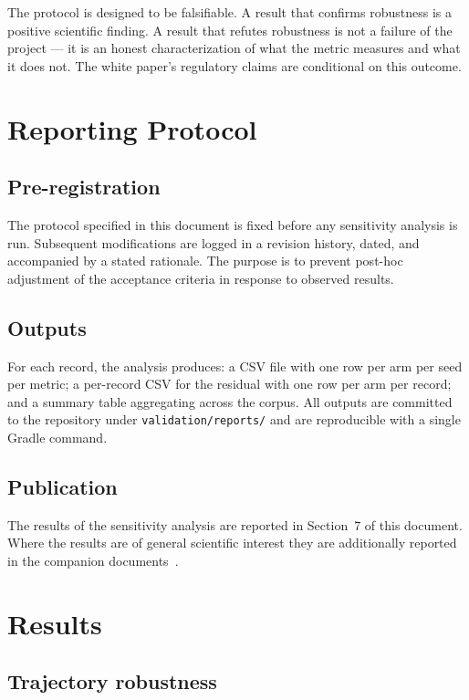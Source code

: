 \documentclass[11pt]{article}
\begin{document}
The protocol is designed to be falsifiable. A result that confirms
robustness is a positive scientific finding. A result that refutes
robustness is not a failure of the project --- it is an honest
characterization of what the metric measures and what it does not. The
white paper's regulatory claims are conditional on this outcome.

\section{Reporting Protocol}

\subsection{Pre-registration}

The protocol specified in this document is fixed before any sensitivity
analysis is run. Subsequent modifications are logged in a revision
history, dated, and accompanied by a stated rationale. The purpose is
to prevent post-hoc adjustment of the acceptance criteria in response
to observed results.

\subsection{Outputs}

For each record, the analysis produces: a CSV file with one row per arm
per seed per metric; a per-record CSV for the residual with one row per
arm per record; and a summary table aggregating across the corpus. All
outputs are committed to the repository under
\texttt{validation/reports/} and are reproducible with a single Gradle
command.

\subsection{Publication}

The results of the sensitivity analysis are reported in Section~7 of
this document. Where the results are of general scientific interest
they are additionally reported in the companion
documents~\cite{simoes2026residual,simoes2026engine}.

\section{Results}

\subsection{Trajectory robustness}
\end{document}
